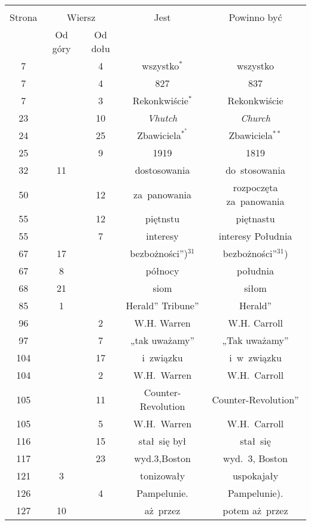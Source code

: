 \documentclass[a4paper,11pt]{article}
\begin{document}
\begin{center}

  \begin{tabular}{|c|c|c|c|c|}
    \hline
    & \multicolumn{2}{c|}{} & & \\
    Strona & \multicolumn{2}{c|}{Wiersz} & Jest
                              & Powinno być \\ \cline{2-3}
    & Od góry & Od dołu & & \\
    \hline
    7   & &  4 & wszystko$^{ * }$ & wszystko \\
    7   & &  4 & 827 & 837 \\
    7   & &  3 & Rekonkwiście$^{ * }$ & Rekonkwiście \\
    23  & & 10 & \emph{Vhutch} & \emph{Church} \\
    24  & & 25 & Zbawiciela$^{ *^{ * } }$ & Zbawiciela$^{ ** }$ \\
    25  & &  9 & 1919 & 1819 \\
    32  & 11 & & dostosowania & do~stosowania \\
    50  & & 12 & za~panowania & rozpoczęta za~panowania \\
    55  & & 12 & piętnstu & piętnastu \\
    55  & &  7 & interesy & interesy Południa \\
    67  & 17 & & bezbożności”)$^{ 31 }$ & bezbożności”$^{ 31 }$) \\
    67  &  8 & & północy & południa \\
    68  & 21 & & siom & siłom \\
    85  &  1 & & Herald” Tribune” & Herald” \\
    96  & &  2 & W.H. Warren & W.H. Carroll \\
    97  & &  7 & „tak uważamy” & „Tak uważamy” \\
    104 & & 17 & i~związku & i~w~związku \\
    104 & &  2 & W.H.~Warren & W.H.~Carroll \\
    105 & & 11 & Counter-Revolution & Counter-Revolution” \\
    105 & &  5 & W.H.~Warren & W.H.~Carroll \\
    116 & & 15 & stał~się był & stał~się \\
    117 & & 23 & wyd.3,Boston & wyd.~3, Boston \\
    121 &  3 & & tonizowały & uspokajały \\
    126 & &  4 & Pampelunie. & Pampelunie). \\
    127 & 10 & & aż~przez & potem aż~przez \\

\end{tabular}
\end{center}
\end{document}
